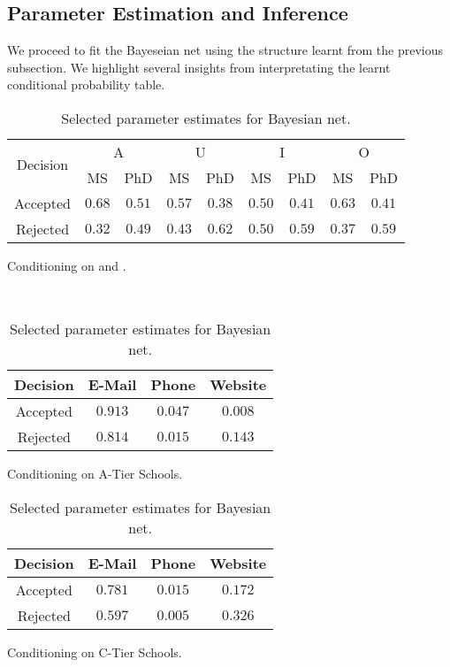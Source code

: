 	\subsection{Parameter Estimation and Inference}

		We proceed to fit the Bayeseian net using the structure learnt from the previous subsection.
		We highlight several insights from interpretating the learnt conditional probability table.

	\begin{table}[htpb]
	    \centering
	    \begin{subtable}{\textwidth}\centering
	    \begin{tabular}{|c|c|c|c|c|c|c|c|c|}
		\hline
			\multirow{ 2}{*}{Decision} & \multicolumn{2}{|c|}{A} & \multicolumn{2}{|c|}{U} & \multicolumn{2}{|c|}{I} & \multicolumn{2}{|c|}{O} \\\cline{2-9}
			& MS & PhD & MS & PhD & MS & PhD & MS & PhD \\\hline
			Accepted & $0.68$ & $0.51$ & $0.57$ & $0.38$ & $0.50$ & $0.41$ & $0.63$ & $0.41$\\\hline
			Rejected & $0.32$ & $0.49$ & $0.43$ & $0.62$ & $0.50$ & $0.59$ & $0.37$ & $0.59$\\\hline
	    \end{tabular}
			\caption{Conditioning on  and .} \label{table:bn:1}
	    \end{subtable} \\

	    \begin{subtable}{0.5\textwidth}\centering
	    \begin{tabular}{|c|c|c|c|}
		\hline
			Decision & E-Mail & Phone & Website \\\hline
			Accepted & $0.913$ & $0.047$ & $0.008$ \\\hline
			Rejected & $0.814$ & $0.015$ & $0.143$ \\\hline
	    \end{tabular}
			\caption{Conditioning on A-Tier Schools.} \label{table:bn:2}
	    \end{subtable}%
	    \begin{subtable}{0.5\textwidth}\centering
	    \begin{tabular}{|c|c|c|c|}
		\hline
			Decision & E-Mail & Phone & Website \\\hline
			Accepted & $0.781$ & $0.015$ & $0.172$ \\\hline
			Rejected & $0.597$ & $0.005$ & $0.326$ \\\hline
	    \end{tabular}
			\caption{Conditioning on C-Tier Schools.} \label{table:bn:3}
	    \end{subtable}%
	    \caption{Selected parameter estimates for Bayesian net.}
	    \label{table:bn}
	\end{table}

